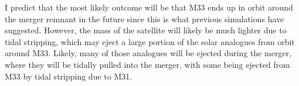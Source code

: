 \documentclass{aastex63}
\begin{document}
I predict that the most likely outcome will be that M33 ends up in orbit around the merger remnant in the future since this is what previous simulations have suggested. However, the mass of the satellite will likely be much lighter due to tidal stripping, which may eject a large portion of the solar analogues from orbit around M33. Likely, many of those analogues will be ejected during the merger, where they will be tidally pulled into the merger, with some being ejected from M33 by tidal stripping due to M31.

{}

\end{document}

